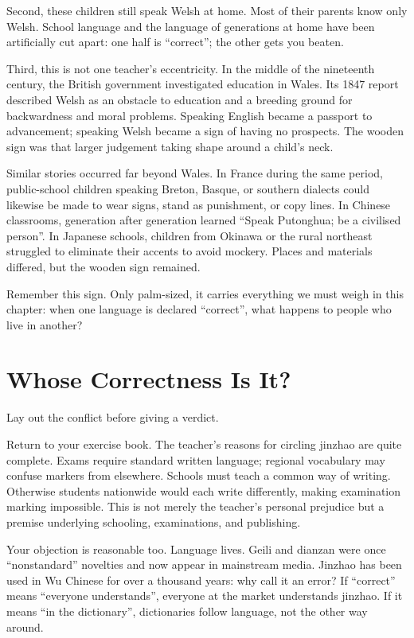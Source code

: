 Second, these children still speak Welsh at home. Most of their parents know only Welsh. School language and the language of generations at home have been artificially cut apart: one half is ``correct''; the other gets you beaten.

Third, this is not one teacher's eccentricity. In the middle of the nineteenth century, the British government investigated education in Wales. Its 1847 report described Welsh as an obstacle to education and a breeding ground for backwardness and moral problems. Speaking English became a passport to advancement; speaking Welsh became a sign of having no prospects. The wooden sign was that larger judgement taking shape around a child's neck.

Similar stories occurred far beyond Wales. In France during the same period, public-school children speaking Breton, Basque, or southern dialects could likewise be made to wear signs, stand as punishment, or copy lines. In Chinese classrooms, generation after generation learned ``Speak Putonghua; be a civilised person''. In Japanese schools, children from Okinawa or the rural northeast struggled to eliminate their accents to avoid mockery. Places and materials differed, but the wooden sign remained.

Remember this sign. Only palm-sized, it carries everything we must weigh in this chapter: when one language is declared ``correct'', what happens to people who live in another?

\section{Whose Correctness Is It?}
Lay out the conflict before giving a verdict.

Return to your exercise book. The teacher's reasons for circling jinzhao are quite complete. Exams require standard written language; regional vocabulary may confuse markers from elsewhere. Schools must teach a common way of writing. Otherwise students nationwide would each write differently, making examination marking impossible. This is not merely the teacher's personal prejudice but a premise underlying schooling, examinations, and publishing.

Your objection is reasonable too. Language lives. Geili and dianzan were once ``nonstandard'' novelties and now appear in mainstream media. Jinzhao has been used in Wu Chinese for over a thousand years: why call it an error? If ``correct'' means ``everyone understands'', everyone at the market understands jinzhao. If it means ``in the dictionary'', dictionaries follow language, not the other way around.

